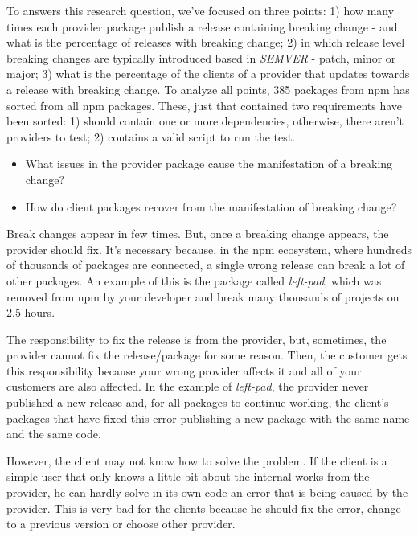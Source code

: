 To answers this research question, we’ve focused on three points: 1) how many times each provider package publish a release containing breaking change - and what is the percentage of releases with breaking change; 2) in which release level breaking changes are typically introduced based in \textit{SEMVER} - patch, minor or major; 3) what is the percentage of the clients of a provider that updates towards a release with breaking change. To analyze all points, 385 packages from npm has sorted from all npm packages. These, just that contained two requirements have been sorted: 1) should contain one or more dependencies, otherwise, there aren’t providers to test; 2) contains a valid script to run the test.

\begin{itemize}
    \item What issues in the provider package cause the manifestation of a breaking change?
\end{itemize}

\begin{itemize}
    \item How do client packages recover from the manifestation of breaking change?
\end{itemize}

Break changes appear in few times. But, once a breaking change appears, the provider should fix. It’s necessary because, in the npm ecosystem, where hundreds of thousands of packages are connected, a single wrong release can break a lot of other packages. An example of this is the package called \textit{left-pad}, which was removed from npm by your developer and break many thousands of projects on 2.5 hours.

The responsibility to fix the release is from the provider, but, sometimes, the provider cannot fix the release/package for some reason. Then, the customer gets this responsibility because your wrong provider affects it and all of your customers are also affected. In the example of \textit{left-pad}, the provider never published a new release and, for all packages to continue working, the client's packages that have fixed this error publishing a new package with the same name and the same code.

However, the client may not know how to solve the problem. If the client is a simple user that only knows a little bit about the internal works from the provider, he can hardly solve in its own code an error that is being caused by the provider. This is very bad for the clients because he should fix the error, change to a previous version or choose other provider.

